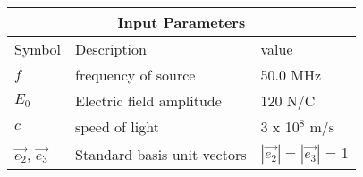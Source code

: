 \setlength{\arrayrulewidth}{0.3mm}
\setlength{\tabcolsep}{15pt}
\renewcommand{\arraystretch}{1.5}

\begin{center}
\begin{tabular}{ |p{1cm}|p{1cm}|p{1.7cm}|  }
\hline
\multicolumn{3}{|c|}{Input Parameters} \\
\hline
Symbol& Description&value\\
\hline
$f$ & frequency of source & 50.0 MHz\\
\hline
$E_0$ & Electric field amplitude  & 120 N/C\\
\hline
$c$ &speed of light & 3 x 10$^8$ m/s \\
\hline
$\vec{e_2}$, $\vec{e_3}$ & Standard basis unit vectors & $|\vec{e_2}| = |\vec{e_3}|$ = 1\\
\hline
\end{tabular}
\end{center}